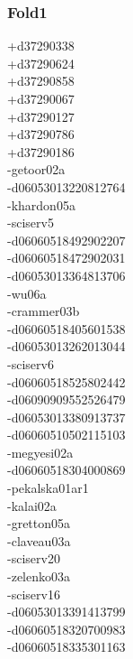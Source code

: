 \begin{multicols}{4}
\subsubsection*{Fold1}
+d37290338\\
+d37290624\\
+d37290858\\
+d37290067\\
+d37290127\\
+d37290786\\
+d37290186\\
-getoor02a\\
-d06053013220812764\\
-khardon05a\\
-sciserv5\\
-d06060518492902207\\
-d06060518472902031\\
-d06053013364813706\\
-wu06a\\
-crammer03b\\
-d06060518405601538\\
-d06053013262013044\\
-sciserv6\\
-d06060518525802442\\
-d06090909552526479\\
-d06053013380913737\\
-d06060510502115103\\
-megyesi02a\\
-d06060518304000869\\
-pekalska01ar1\\
-kalai02a\\
-gretton05a\\
-claveau03a\\
-sciserv20\\
-zelenko03a\\
-sciserv16\\
-d06053013391413799\\
-d06060518320700983\\
-d06060518335301163\\

\end{multicols}
